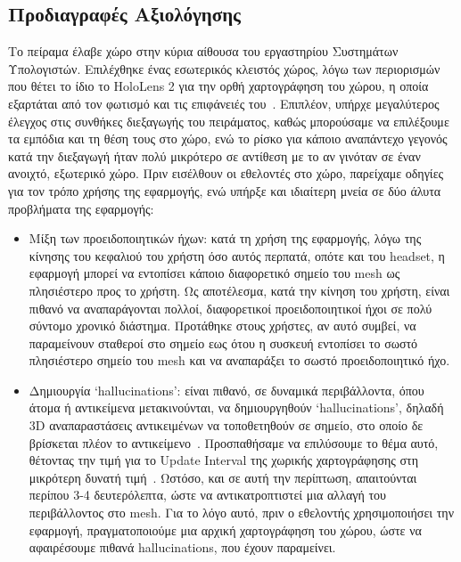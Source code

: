 \subsection{Προδιαγραφές Αξιολόγησης}\label{subsec:experimentSpecsForEvaluation}
Το πείραμα έλαβε χώρο στην κύρια αίθουσα του εργαστηρίου Συστημάτων Υπολογιστών. Επιλέχθηκε ένας εσωτερικός κλειστός χώρος, λόγω των περιορισμών που θέτει το ίδιο το HoloLens 2 για την ορθή χαρτογράφηση του χώρου, η οποία εξαρτάται από τον φωτισμό και τις επιφάνειές του~\cite{mattzmsft_2023_spatial}. Επιπλέον, υπήρχε μεγαλύτερος έλεγχος στις συνθήκες διεξαγωγής του πειράματος, καθώς μπορούσαμε να επιλέξουμε τα εμπόδια και τη θέση τους στο χώρο, ενώ το ρίσκο για κάποιο αναπάντεχο γεγονός κατά την διεξαγωγή ήταν πολύ μικρότερο σε αντίθεση με το αν γινόταν σε έναν ανοιχτό, εξωτερικό χώρο.
Πριν εισέλθουν οι εθελοντές στο χώρο, παρείχαμε οδηγίες για τον τρόπο χρήσης της εφαρμογής, ενώ υπήρξε και ιδιαίτερη μνεία σε δύο άλυτα προβλήματα της εφαρμογής:
\begin{itemize}
    \item Μίξη των προειδοποιητικών ήχων: κατά τη χρήση της εφαρμογής, λόγω της κίνησης του κεφαλιού του χρήστη όσο αυτός περπατά, οπότε και του headset, η εφαρμογή μπορεί να εντοπίσει κάποιο διαφορετικό σημείο του mesh ως πλησιέστερο προς το χρήστη. Ως αποτέλεσμα, κατά την κίνηση του χρήστη, είναι πιθανό να αναπαράγονται πολλοί, διαφορετικοί προειδοποιητικοί ήχοι σε πολύ σύντομο χρονικό διάστημα. Προτάθηκε στους χρήστες, αν αυτό συμβεί, να παραμείνουν σταθεροί στο σημείο εως ότου η συσκευή εντοπίσει το σωστό πλησιέστερο σημείο του mesh και να αναπαράξει το σωστό προειδοποιητικό ήχο.
    \item Δημιουργία `hallucinations': είναι πιθανό, σε δυναμικά περιβάλλοντα, όπου άτομα ή αντικείμενα μετακινούνται, να δημιουργηθούν `hallucinations', δηλαδή 3D αναπαραστάσεις αντικειμένων να τοποθετηθούν σε σημείο, στο οποίο δε βρίσκεται πλέον το αντικείμενο~\cite{mattzmsft_2023_spatial}. Προσπαθήσαμε να επιλύσουμε το θέμα αυτό, θέτοντας την τιμή για το Update Interval της χωρικής χαρτογράφησης στη μικρότερη δυνατή τιμή~\cite{davidklinems_2022_configuring}. Ωστόσο, και σε αυτή την περίπτωση, απαιτούνται περίπου 3-4 δευτερόλεπτα, ώστε να αντικατροπτιστεί μια αλλαγή του περιβάλλοντος στο mesh. Για το λόγο αυτό, πριν ο εθελοντής χρησιμοποιήσει την εφαρμογή, πραγματοποιούμε μια αρχική χαρτογράφηση του χώρου, ώστε να αφαιρέσουμε πιθανά hallucinations, που έχουν παραμείνει. %
\end{itemize}

